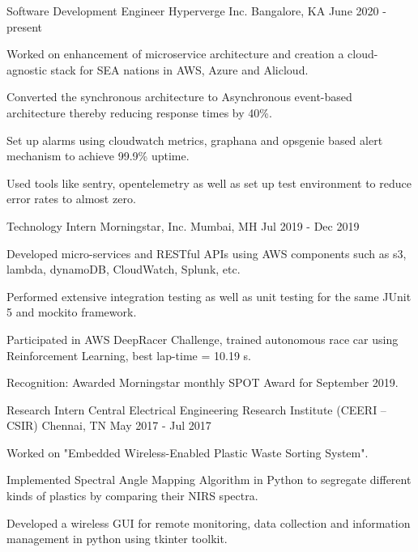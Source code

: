 \begin{cventries}
  \cventry
  {Software Development Engineer}
  {Hyperverge Inc.}
  {Bangalore, KA}
  {June 2020 - present}
  {
    \begin{cvitems}
      \item {Worked on enhancement of microservice architecture and creation a cloud-agnostic stack for SEA nations in AWS, Azure and Alicloud.}
      \item {Converted the synchronous architecture to Asynchronous event-based architecture thereby reducing response times by 40\%.}    
      \item {Set up alarms using cloudwatch metrics, graphana and opsgenie based alert mechanism to achieve 99.9\% uptime.}
      \item {Used tools like sentry, opentelemetry as well as set up test environment to reduce error rates to almost zero.}
    \end{cvitems}
  }
  \cventry
    {Technology Intern}
    {Morningstar, Inc.}
    {Mumbai, MH}
    {Jul 2019 - Dec 2019}
    {
      \begin{cvitems}
        \item {Developed micro-services and RESTful APIs using AWS components such as s3, lambda, dynamoDB, CloudWatch, Splunk, etc.}
        \item {Performed extensive integration testing as well as unit testing for the same JUnit 5 and mockito framework.}
        \item {Participated in AWS DeepRacer Challenge, trained autonomous race car using Reinforcement Learning, best lap-time = 10.19 s.}
        \item {Recognition: Awarded Morningstar monthly SPOT Award for September 2019.}
      \end{cvitems}
    }
  \cventry
    {Research Intern}
    {Central Electrical Engineering Research Institute (CEERI – CSIR)}
    {Chennai, TN}
    {May 2017 - Jul 2017}
    {
      \begin{cvitems}
        \item {Worked on "Embedded Wireless-Enabled Plastic Waste Sorting System".}
        \item {Implemented Spectral Angle Mapping Algorithm in Python to segregate different kinds of plastics by comparing their NIRS spectra.}
        \item {Developed a wireless GUI for remote monitoring, data collection and information management in python using tkinter toolkit.}
      \end{cvitems}
    }

\end{cventries}
